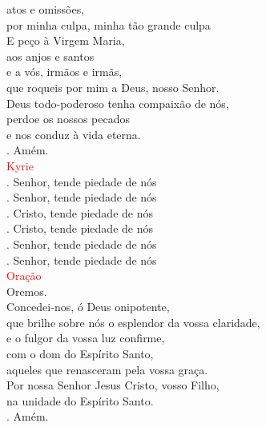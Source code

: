 \documentclass{book}
\begin{document}
\begin{flushleft}
    atos e omissões, \\
    por minha culpa, minha tão grande culpa \\
    E peço à Virgem Maria, \\
    aos anjos e santos \\
    e a vós, irmãos e irmãs, \\
    que roqueis por mim a Deus, nosso Senhor.
    \vspace{.1cm} \\
    Deus todo-poderoso tenha compaixão de nós, \\
    perdoe os nossos pecados \\
    e nos conduz à vida eterna. \\
    {\color{red} \Rbar.} Amém.
    \vspace{.2cm} \\
    \textcolor{red}{Kyrie}
    \vspace{.2cm} \\
    {\color{red} \Vbar.} Senhor, tende piedade de nós \\
    {\color{red} \Rbar.} Senhor, tende piedade de nós
    \vspace{.1cm} \\
    {\color{red} \Vbar.} Cristo, tende piedade de nós \\
    {\color{red} \Rbar.} Cristo, tende piedade de nós
    \vspace{.1cm} \\
    {\color{red} \Vbar.} Senhor, tende piedade de nós \\
    {\color{red} \Rbar.} Senhor, tende piedade de nós
    \vspace{.2cm} \\
    \textcolor{red}{Oração}
    \vspace{.1cm} \\
    Oremos.
    \vspace{.1cm}\\
    Concedei-nos, ó Deus onipotente, \\
    que brilhe sobre nós o esplendor da vossa claridade, \\
    e o fulgor da vossa luz confirme, \\
    com o dom do Espírito Santo, \\
    aqueles que renasceram pela vossa graça. \\
    Por nossa Senhor Jesus Cristo, vosso Filho, \\
    na unidade do Espírito Santo. \\
    {\color{red} \Rbar.} Amém. \\


\end{flushleft}
\end{document}

